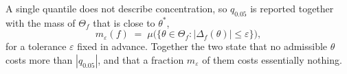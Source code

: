 A single quantile does not describe concentration, so $q_{0.05}$ is reported
together with the mass of $\Theta_f$ that is close to $\theta^{\ast}$,
%
\begin{equation}
  m_\varepsilon(f) \;=\; \mu\bigl(\{\theta\in\Theta_f :
    |\Delta_f(\theta)| \le \varepsilon\}\bigr),
\end{equation}
%
for a tolerance $\varepsilon$ fixed in advance.  Together the two state that
no admissible $\theta$ costs more than $|q_{0.05}|$, and that a fraction
$m_\varepsilon$ of them costs essentially nothing.
